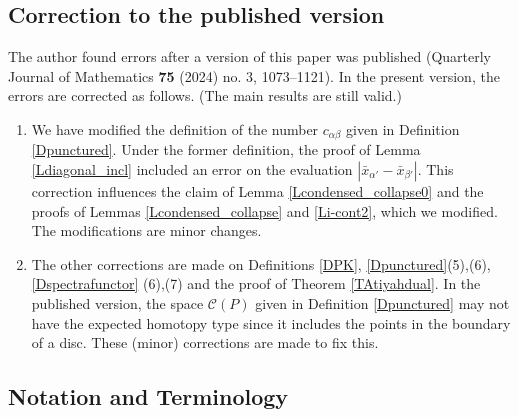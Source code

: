 \documentclass[reqno]{amsart}
\theoremstyle{definition}
\theoremstyle{plain}
\begin{document}
\subsection{Correction to the published version}
 The author found errors after a version of this paper was  published  (Quarterly Journal of Mathematics {\bf 75} (2024) no. 3, 1073–1121). In the present version, the errors are corrected as follows. (The main results are still valid.)
\begin{enumerate}
\item We have modified the definition of the number $c_{\alpha\beta}$ given in Definition \ref{Dpunctured}. Under the former definition, the proof of Lemma \ref{Ldiagonal_incl} included an error on the evaluation $|\bar x_{\alpha'}-\bar x_{\beta'}|$. This correction influences the claim of Lemma \ref{Lcondensed_collapse0} and the proofs of Lemmas \ref{Lcondensed_collapse} and \ref{Li-cont2}, which we modified. The modifications are minor changes. %
\item The other corrections are made on Definitions \ref{DPK}, \ref{Dpunctured}(5),(6), \ref{Dspectrafunctor} (6),(7) and the proof of Theorem \ref{TAtiyahdual}. In the published version, the space $\mathcal{C}(P)$ given in Definition \ref{Dpunctured} may not have the expected homotopy type since it includes the points in the boundary of a disc. These (minor) corrections are made to fix this.
\end{enumerate} 
\subsection{Notation and Terminology}\label{SSNT}
\end{document}
